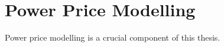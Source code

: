 

%

\chapter{Power Price Modelling}
\label{ch:Power_Price_modelling}

    Power price modelling is a crucial component of this thesis.













